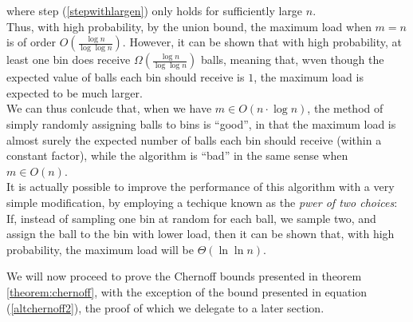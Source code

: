 	where step (\ref{stepwithlargen}) only holds for sufficiently large $n$. \\
	Thus, with high probability, by the union bound, the maximum load when $m=n$ is of order 
	$O\left(\frac{\log n}{\log \log n}\right)$. However, it can be shown that with high 
	probability, at least one bin does receive $\Omega\left(\frac{\log n}{\log \log n}\right)$
	balls, meaning that, wven though the expected value of balls each bin should receive is 
	$1$, the maximum load is expected to be much larger. 
	\\
	We can thus conlcude that, when we have $m \in O(n \cdot \log n)$, the method of simply 
	randomly assigning balls to bins is ``good'', in that the maximum load is almost surely 
	the expected number of balls each bin should receive (within a constant factor), while the 
	algorithm is ``bad'' in the same sense when $m \in O(n)$.
	\\
	It is actually possible to improve the performance of this algorithm with a very simple 
	modification, by employing a techique known as the \emph{pwer of two choices}: If, instead 
	of sampling one bin at random for each ball, we sample two, and assign the ball to the bin 
	with lower load, then it can be shown that, with high probability, the maximum load will 
	be $\Theta(\ln\ln n)$.
	\par
	We will now proceed to prove the Chernoff bounds presented in theorem 
	\ref{theorem:chernoff}, with the exception of the bound presented in equation 
	(\ref{altchernoff2}), the proof of which we delegate to a later section.
